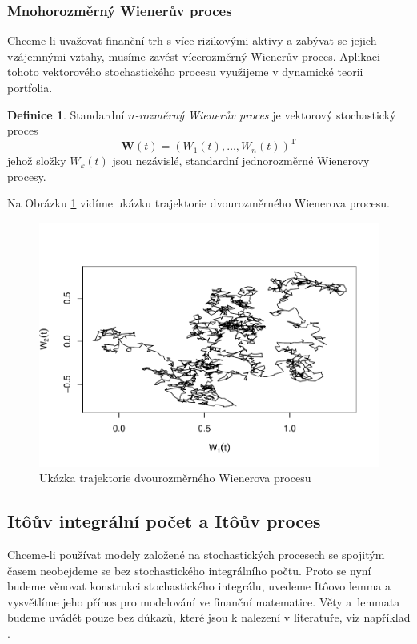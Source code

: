 \documentclass[a4paper,12pt]{report}
\theoremstyle{definition} \newtheorem{definice}[veta]{Definice}
\theoremstyle{remark}
\begin{document}
\subsubsection{Mnohorozměrný Wienerův proces}
Chceme-li uvažovat finanční trh s více rizikovými aktivy a zabývat se jejich vzájemnými vztahy, musíme zavést vícerozměrný Wienerův proces.
Aplikaci tohoto vektorového stochastického procesu využijeme v dynamické teorii portfolia.

\begin{definice}
Standardní \textit{$n$-rozměrný Wienerův proces} je vektorový stochastický proces
$$\boldsymbol{W}(t) = (W_1(t), \dots, W_n(t))^\mathrm{T}$$
jehož složky $W_k(t)$ jsou nezávislé, standardní jednorozměrné Wienerovy procesy.
\end{definice}

Na Obrázku \ref{WP_2D_graf} vidíme ukázku trajektorie dvourozměrného Wienerova procesu.
\begin{figure}[!htbp]
  \centering 
	\includegraphics[width=13.5cm, clip, trim= 0 20 25 50]{IMG/WP_2D_v6.pdf}
  \caption{Ukázka trajektorie dvourozměrného Wienerova procesu}  \label{WP_2D_graf}
\end{figure}


\subsection{It\^oův integrální počet a It\^oův proces}\label{Ito_kalkul}
Chceme-li používat modely založené na stochastických procesech se spojitým časem neobejdeme se bez stochastického integrálního počtu.
Proto se nyní budeme věnovat konstrukci stochastického integrálu, uvedeme It\^oovo lemma a vysvětlíme jeho přínos pro modelování ve finanční matematice.
Věty a~lemmata budeme uvádět pouze bez důkazů, které jsou k nalezení v literatuře, viz například \cite{karatzas2012brownian}.
\end{document}
